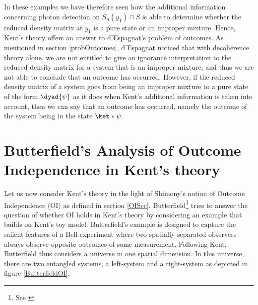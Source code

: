 \documentclass[12pt]{report}
\begin{document}
In these examples we have therefore seen how the additional information concerning photon detection on $S_n(y_1)\cap S$ is able to determine whether the reduced density matrix at $y_1$ is a pure state or an improper mixture. Hence, Kent's theory offers an answer to d'Espagnat's problem of outcomes. As mentioned in section \ref{probOutcomes}, d'Espagnat noticed that with decoherence theory alone, we are not entitled to give an ignorance interpretation to the reduced density matrix for a system that is an improper mixture, and thus we are not able to conclude that an outcome has occurred. However, if the reduced density matrix of a system goes from being an improper mixture to a pure state of the form $\dyad{\psi}$ as it does when Kent's additional information is taken into account, then we can say that an outcome has occurred, namely the outcome of the system being in the state $\ket*{\psi}.$  












\section{Butterfield's Analysis of Outcome Independence  in Kent's theory\label{butterfieldtoy}}
Let us now consider Kent's theory in the light of Shimony's notion of Outcome Independence (OI)  as defined in section \ref{OISec}. 
Butterfield\footnote{See \cite[30-32]{Butterfield}} tries to answer the question of whether OI holds in Kent's theory by considering an example that builds on Kent's toy model. Butterfield's example is designed to capture the salient features of a Bell experiment where two spatially separated observers always observe opposite outcomes of some measurement. Following Kent, Butterfield thus considers a universe in one spatial dimension. In this universe, there are two entangled systems, a left-system and a right-system as depicted in figure \ref{ButterfieldOI}.  
\end{document}
